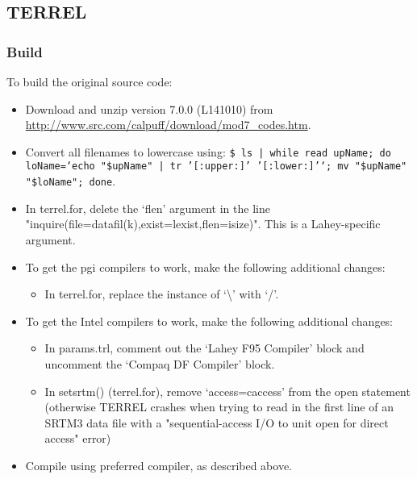 \documentclass[10pt,a4paper]{article}
\begin{document}
\subsection{TERREL}
\subsubsection{Build}
To build the original source code:
\begin{itemize}
\item Download and unzip version 7.0.0 (L141010) from \url{http://www.src.com/calpuff/download/mod7_codes.htm}.
\item Convert all filenames to lowercase using: \texttt{\$ ls | while read upName; do loName=`echo "\${upName}" | tr '[:upper:]' '[:lower:]'`; mv "\$upName" "\$loName"; done}.
\item In terrel.for, delete the `flen' argument in the line "inquire(file=datafil(k),exist=lexist,flen=isize)". This is a Lahey-specific argument.
\item To get the pgi compilers to work, make the following additional changes:
\begin{itemize}
\item In terrel.for, replace the instance of `\textbackslash' with `/'.
\end{itemize}
\item To get the Intel compilers to work, make the following additional changes:
\begin{itemize}
\item In params.trl, comment out the `Lahey F95 Compiler' block and uncomment the `Compaq DF Compiler' block.
\item In setsrtm() (terrel.for), remove `access=caccess' from the open statement (otherwise TERREL crashes when trying to read in the first line of an SRTM3 data file with a "sequential-access I/O to unit open for direct access" error)
\end{itemize}
\item Compile using preferred compiler, as described above.
\end{itemize}
\end{document}
